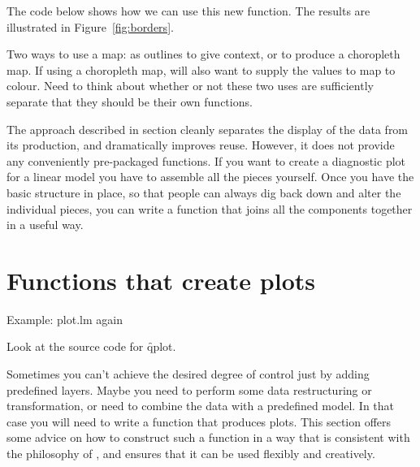 % 


The code below shows how we can use this new function.  The results are illustrated in Figure~\ref{fig:borders}.

% 
% 


Two ways to use a map: as outlines to give context, or to produce a choropleth map.  If using a choropleth map, will also want to supply the values to map to colour.  Need to think about whether or not these two uses are sufficiently separate that they should be their own functions.  

The approach described in section cleanly separates the display of the data from its production, and dramatically improves reuse.  However, it does not provide any conveniently pre-packaged functions.  If you want to create a diagnostic plot for a linear model you have to assemble all the pieces yourself.  Once you have the basic structure in place, so that people can always dig back down and alter the individual pieces, you can write a function that joins all the components together in a useful way.

\section{Functions that create plots}
\label{sec:functions}

Example: plot.lm again

Look at the source code for \f{qplot}.


Sometimes you can't achieve the desired degree of control just by adding predefined layers.  Maybe you need to perform some data restructuring or transformation, or need to combine the data with a predefined model.  In that case you will need to write a function that produces \ggplot plots.  This section offers some advice on how to construct such a function in a way that is consistent with the philosophy of \ggplot, and ensures that it can be used flexibly and creatively.

